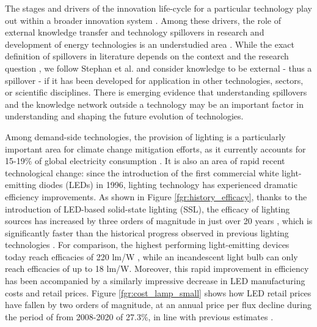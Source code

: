 \documentclass[twoside,twocolumn,9pt]{article}
\begin{document}
 
The stages and drivers of the innovation life-cycle for a particular technology play out within a broader innovation system \cite{grubler2012policies}\cite{Anadon2016}. Among these drivers, the role of external  knowledge transfer and technology spillovers in research and development of energy technologies is an understudied area  \cite{Stephan2021}. While the exact definition of spillovers in literature depends on the context and the research question \cite{Liu2003}\cite{Nemet2012}, we follow Stephan et al. \cite{Stephan2021} and consider knowledge to be external - thus a spillover -  if it has been developed for application in other technologies, sectors, or scientific disciplines. There is emerging evidence that understanding spillovers and the knowledge network outside a technology may be an important factor in understanding \cite{Pichler2020} and shaping \cite{Clark2016}\cite{Stephan2021}\cite{Sun2021}\cite{kolesnikov_framework_2022} the future evolution of technologies.  

Among demand-side technologies, the provision of lighting is a particularly important area for climate change mitigation efforts, as it currently   accounts for 15-19\% of global electricity consumption \cite{Zissis2016}\cite{doe_electricity}. It is also an area of rapid recent technological change: since the introduction of the first commercial white light-emitting diodes (LEDs) in 1996, lighting technology has experienced dramatic efficiency improvements.  As shown in Figure \ref{fgr:history_efficacy}, thanks to the introduction of LED-based solid-state lighting (SSL), the efficacy of lighting sources has increased by three orders of magnitude in just over 20 years , which is significantly faster than the historical progress observed in previous lighting technologies \cite{weinold2021quantifying}. For comparison, the highest performing light-emitting devices today reach efficacies of 220 lm/W \cite{lumistrips2021mid}, while an incandescent light bulb can only reach efficacies of up to 18 lm/W. Moreover, this rapid improvement in efficiency has been accompanied by a similarly impressive decrease in LED manufacturing costs and retail prices. Figure \ref{fgr:cost_lamp_small} shows how LED retail prices have fallen by two orders of magnitude, at an annual price per flux decline during the period of from 2008-2020 of 27.3\%, in line with previous estimates \cite{Gerke2020}.  
\end{document}
